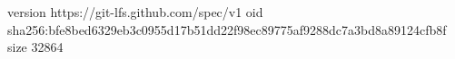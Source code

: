 version https://git-lfs.github.com/spec/v1
oid sha256:bfe8bed6329eb3c0955d17b51dd22f98ec89775af9288dc7a3bd8a89124cfb8f
size 32864
